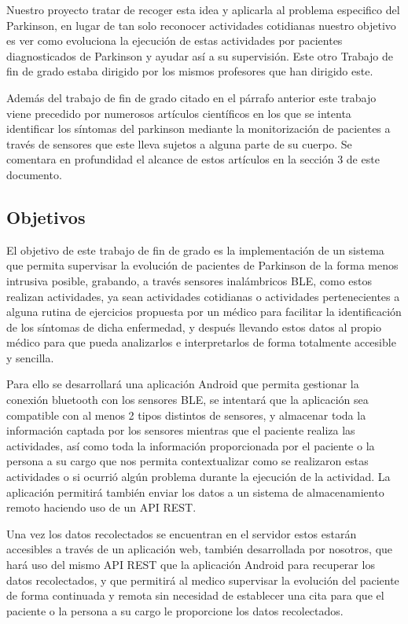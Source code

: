 Nuestro proyecto tratar de recoger esta idea y aplicarla al problema especifico del Parkinson, en lugar de tan solo reconocer actividades cotidianas nuestro objetivo es ver como evoluciona la ejecución de estas actividades por pacientes diagnosticados de Parkinson y ayudar así a su supervisión. Este otro Trabajo de fin de grado estaba dirigido por los mismos profesores que han dirigido este.
\newline

Además del trabajo de fin de grado citado en el párrafo anterior este trabajo viene precedido por numerosos artículos científicos en los que se intenta identificar los síntomas del parkinson mediante la monitorización de pacientes a través de sensores que este lleva sujetos a alguna parte de su cuerpo. Se comentara en profundidad el alcance de estos artículos en la sección 3 de este documento.

\subsection{Objetivos}

El objetivo de este trabajo de fin de grado es la implementación de un sistema que permita supervisar la evolución de pacientes de Parkinson de la forma menos intrusiva posible, grabando, a través sensores inalámbricos BLE, como estos realizan actividades, ya sean actividades cotidianas o actividades pertenecientes a alguna rutina de ejercicios propuesta por un médico para facilitar la identificación de los síntomas de dicha enfermedad, y después llevando estos datos al propio médico para que pueda analizarlos e interpretarlos de forma totalmente accesible y sencilla. 
\newline

Para ello se desarrollará una aplicación Android que permita gestionar la conexión bluetooth con los sensores BLE, se intentará que la aplicación sea compatible con al menos 2 tipos distintos de sensores, y almacenar toda la información captada por los sensores mientras que el paciente realiza las actividades, así como toda la información proporcionada por el paciente o la persona a su cargo que nos permita contextualizar como se realizaron estas actividades o si ocurrió algún problema durante la ejecución de la actividad. La aplicación permitirá también enviar los datos a un sistema de almacenamiento remoto haciendo uso de un API REST. 
\newline

Una vez los datos recolectados se encuentran en el servidor estos estarán accesibles a través de un aplicación web, también desarrollada por nosotros, que hará uso del mismo API REST que la aplicación Android para recuperar los datos recolectados, y que permitirá al medico supervisar la evolución del paciente de forma continuada y remota sin necesidad de establecer una cita para que el paciente o la persona a su cargo le proporcione los datos recolectados. 
\newline

